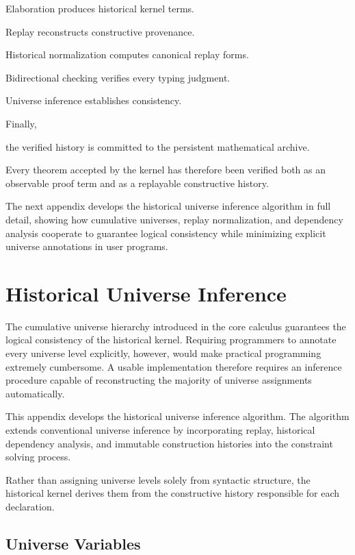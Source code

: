 \documentclass[12pt,oneside]{article}
\theoremstyle{definition}
\theoremstyle{remark}
\begin{document}
Elaboration produces historical kernel terms.

Replay reconstructs constructive provenance.

Historical normalization computes canonical replay forms.

Bidirectional checking verifies every typing judgment.

Universe inference establishes consistency.

Finally,

the verified history is committed to the persistent mathematical archive.

Every theorem accepted by the kernel has therefore been verified both as an
observable proof term and as a replayable constructive history.

The next appendix develops the historical universe inference algorithm in full
detail, showing how cumulative universes, replay normalization, and dependency
analysis cooperate to guarantee logical consistency while minimizing explicit
universe annotations in user programs.

\section{Historical Universe Inference}

The cumulative universe hierarchy introduced in the core calculus guarantees the
logical consistency of the historical kernel. Requiring programmers to annotate
every universe level explicitly, however, would make practical programming
extremely cumbersome. A usable implementation therefore requires an inference
procedure capable of reconstructing the majority of universe assignments
automatically.

This appendix develops the historical universe inference algorithm. The
algorithm extends conventional universe inference by incorporating replay,
historical dependency analysis, and immutable construction histories into the
constraint solving process.

Rather than assigning universe levels solely from syntactic structure, the
historical kernel derives them from the constructive history responsible for
each declaration.


\subsection{Universe Variables}
\end{document}
